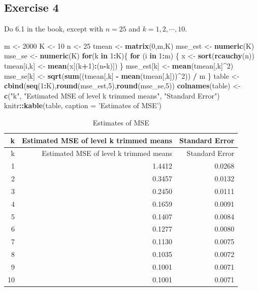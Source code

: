 \documentclass[
]{article}
\newenvironment{Shaded}{\begin{snugshade}}{\end{snugshade}}
\newcommand{\ControlFlowTok}[1]{\textcolor[rgb]{0.13,0.29,0.53}{\textbf{#1}}}
\newcommand{\DataTypeTok}[1]{\textcolor[rgb]{0.13,0.29,0.53}{#1}}
\newcommand{\DecValTok}[1]{\textcolor[rgb]{0.00,0.00,0.81}{#1}}
\newcommand{\KeywordTok}[1]{\textcolor[rgb]{0.13,0.29,0.53}{\textbf{#1}}}
\newcommand{\NormalTok}[1]{#1}
\newcommand{\OperatorTok}[1]{\textcolor[rgb]{0.81,0.36,0.00}{\textbf{#1}}}
\newcommand{\StringTok}[1]{\textcolor[rgb]{0.31,0.60,0.02}{#1}}
\begin{document}
\hypertarget{exercise-4}{%
\subsection{Exercise 4}\label{exercise-4}}

Do 6.1 in the book, except with \(n=25\) and \(k=1,2,\cdots,10\).

\begin{Shaded}
\begin{Highlighting}[]
\NormalTok{m <-}\StringTok{ }\DecValTok{2000}
\NormalTok{K <-}\StringTok{ }\DecValTok{10}
\NormalTok{n <-}\StringTok{ }\DecValTok{25}
\NormalTok{tmean <-}\StringTok{ }\KeywordTok{matrix}\NormalTok{(}\DecValTok{0}\NormalTok{,m,K)}
\NormalTok{mse_est <-}\StringTok{ }\KeywordTok{numeric}\NormalTok{(K)}
\NormalTok{mse_se <-}\StringTok{ }\KeywordTok{numeric}\NormalTok{(K)}
\ControlFlowTok{for}\NormalTok{(k }\ControlFlowTok{in} \DecValTok{1}\OperatorTok{:}\NormalTok{K)\{}
  \ControlFlowTok{for}\NormalTok{ (i }\ControlFlowTok{in} \DecValTok{1}\OperatorTok{:}\NormalTok{m) \{}
\NormalTok{    x <-}\StringTok{ }\KeywordTok{sort}\NormalTok{(}\KeywordTok{rcauchy}\NormalTok{(n))}
\NormalTok{    tmean[i,k] <-}\StringTok{ }\KeywordTok{mean}\NormalTok{(x[(k}\OperatorTok{+}\DecValTok{1}\NormalTok{)}\OperatorTok{:}\NormalTok{(n}\OperatorTok{-}\NormalTok{k)])}
\NormalTok{    \}}
\NormalTok{  mse_est[k] <-}\StringTok{ }\KeywordTok{mean}\NormalTok{(tmean[,k]}\OperatorTok{^}\DecValTok{2}\NormalTok{)}
\NormalTok{  mse_se[k] <-}\StringTok{ }\KeywordTok{sqrt}\NormalTok{(}\KeywordTok{sum}\NormalTok{((tmean[,k] }\OperatorTok{-}\StringTok{ }\KeywordTok{mean}\NormalTok{(tmean[,k]))}\OperatorTok{^}\DecValTok{2}\NormalTok{)) }\OperatorTok{/}\StringTok{ }\NormalTok{m}
\NormalTok{\}}
\NormalTok{table <-}\StringTok{ }\KeywordTok{cbind}\NormalTok{(}\KeywordTok{seq}\NormalTok{(}\DecValTok{1}\OperatorTok{:}\NormalTok{K),}\KeywordTok{round}\NormalTok{(mse_est,}\DecValTok{5}\NormalTok{),}\KeywordTok{round}\NormalTok{(mse_se,}\DecValTok{5}\NormalTok{))}
\KeywordTok{colnames}\NormalTok{(table) <-}\StringTok{ }\KeywordTok{c}\NormalTok{(}\StringTok{"k"}\NormalTok{, }\StringTok{"Estimated MSE of level k trimmed means"}\NormalTok{, }\StringTok{"Standard Error"}\NormalTok{)}
\NormalTok{knitr}\OperatorTok{::}\KeywordTok{kable}\NormalTok{(table, }\DataTypeTok{caption =} \StringTok{'Estimates of MSE'}\NormalTok{)}
\end{Highlighting}
\end{Shaded}

\begin{longtable}[]{@{}rrr@{}}
\caption{Estimates of MSE}\tabularnewline
\toprule
k & Estimated MSE of level k trimmed means & Standard
Error\tabularnewline
\midrule
\endfirsthead
\toprule
k & Estimated MSE of level k trimmed means & Standard
Error\tabularnewline
\midrule
\endhead
1 & 1.4412 & 0.0268\tabularnewline
2 & 0.3457 & 0.0132\tabularnewline
3 & 0.2450 & 0.0111\tabularnewline
4 & 0.1659 & 0.0091\tabularnewline
5 & 0.1407 & 0.0084\tabularnewline
6 & 0.1277 & 0.0080\tabularnewline
7 & 0.1130 & 0.0075\tabularnewline
8 & 0.1035 & 0.0072\tabularnewline
9 & 0.1001 & 0.0071\tabularnewline
10 & 0.1001 & 0.0071\tabularnewline
\bottomrule
\end{longtable}
\end{document}
